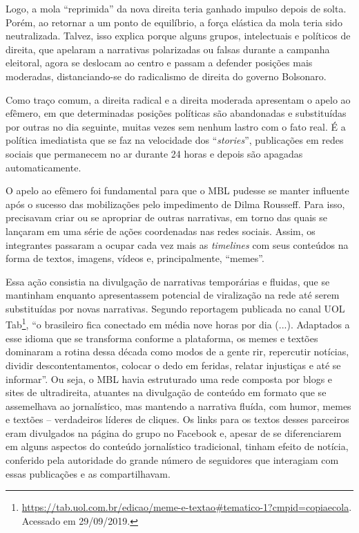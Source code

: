 Logo, a mola ``reprimida'' da nova direita teria ganhado impulso depois
de solta. Porém, ao retornar a um ponto de equilíbrio, a força elástica
da mola teria sido neutralizada. Talvez, isso explica porque alguns
grupos, intelectuais e políticos de direita, que apelaram a narrativas
polarizadas ou falsas durante a campanha eleitoral, agora se deslocam ao
centro e passam a defender posições mais moderadas, distanciando-se do
radicalismo de direita do governo Bolsonaro.

Como traço comum, a direita radical e a direita moderada apresentam o
apelo ao efêmero, em que determinadas posições políticas são abandonadas
e substituídas por outras no dia seguinte, muitas vezes sem nenhum
lastro com o fato real. É a política imediatista que se faz na
velocidade dos ``\emph{stories}'', publicações em redes sociais que
permanecem no ar durante 24 horas e depois são apagadas automaticamente.

O apelo ao efêmero foi fundamental para que o MBL pudesse se manter
influente após o sucesso das mobilizações pelo impedimento de Dilma
Rousseff. Para isso, precisavam criar ou se apropriar de outras
narrativas, em torno das quais se lançaram em uma série de ações
coordenadas nas redes sociais. Assim, os integrantes passaram a ocupar
cada vez mais as \emph{timelines} com seus conteúdos na forma de textos,
imagens, vídeos e, principalmente, ``memes''.

Essa ação consistia na divulgação de narrativas temporárias e fluidas,
que se mantinham enquanto apresentassem potencial de viralização na rede
até serem substituídas por novas narrativas. Segundo reportagem
publicada no canal UOL Tab\footnote{\url{https://tab.uol.com.br/edicao/meme-e-textao\#tematico-1?cmpid=copiaecola}.
  Acessado em 29/09/2019.}, ``o brasileiro fica conectado em média nove
horas por dia (...). Adaptados a esse idioma que se transforma conforme
a plataforma, os memes e textões dominaram a rotina dessa década como
modos de a gente rir, repercutir notícias, dividir descontentamentos,
colocar o dedo em feridas, relatar injustiças e até se informar''. Ou
seja, o MBL havia estruturado uma rede composta por blogs e sites de
ultradireita, atuantes na divulgação de conteúdo em formato que se
assemelhava ao jornalístico, mas mantendo a narrativa fluída, com humor,
memes e textões -- verdadeiros líderes de cliques. Os links para os
textos desses parceiros eram divulgados na página do grupo no Facebook
e, apesar de se diferenciarem em alguns aspectos do conteúdo
jornalístico tradicional, tinham efeito de notícia, conferido pela
autoridade do grande número de seguidores que interagiam com essas
publicações e as compartilhavam.

